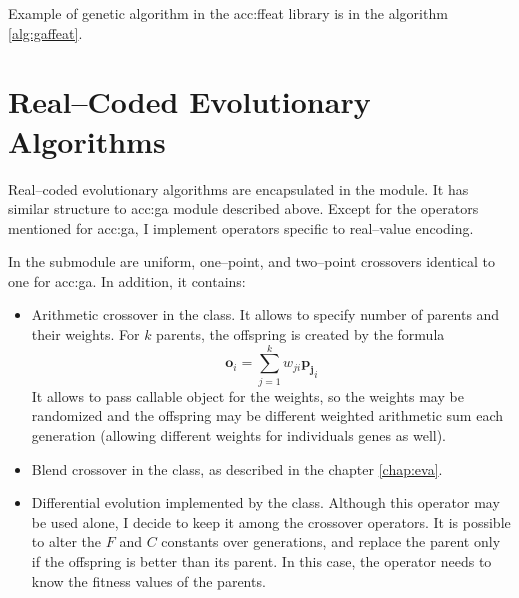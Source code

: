 Example of genetic algorithm in the \acrshort{acc:ffeat} library is in the algorithm \ref{alg:gaffeat}.




\section{Real--Coded Evolutionary Algorithms}

Real--coded evolutionary algorithms are encapsulated in the  module. It has similar structure to \acrshort{acc:ga} module described above. Except for the operators mentioned for \acrshort{acc:ga}, I implement operators specific to real--value encoding.

In the  submodule are uniform, one--point, and two--point crossovers identical to one for \acrshort{acc:ga}. In addition, it contains:
\begin{itemize}
    \item Arithmetic crossover in the  class. It allows to specify number of parents and their weights. For $k$ parents, the offspring is created by the formula 
    $$\mathbf{o}_i=\sum_{j=1}^k w_{ji}\mathbf{p_j}_i$$
    It allows to pass callable object for the weights, so the weights may be randomized and the offspring may be different weighted arithmetic sum each generation (allowing different weights for individuals genes as well).
    \item Blend crossover in the  class, as described in the chapter \ref{chap:eva}.
    \item Differential evolution implemented by the  class. Although this operator may be used alone, I decide to keep it among the crossover operators. It is possible to alter the $F$ and $C$ constants over generations, and replace the parent only if the offspring is better than its parent. In this case, the operator needs to know the fitness values of the parents.
\end{itemize}

